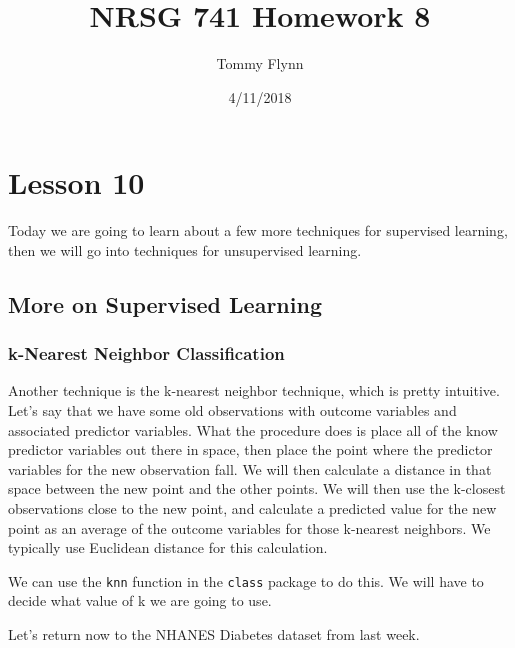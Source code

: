\documentclass[]{article}
\title{NRSG 741 Homework 8}
\author{Tommy Flynn}
\date{4/11/2018}
\newenvironment{Shaded}{\begin{snugshade}}{\end{snugshade}}
\newcommand{\KeywordTok}[1]{\textcolor[rgb]{0.13,0.29,0.53}{\textbf{#1}}}
\newcommand{\StringTok}[1]{\textcolor[rgb]{0.31,0.60,0.02}{#1}}
\newcommand{\CommentTok}[1]{\textcolor[rgb]{0.56,0.35,0.01}{\textit{#1}}}
\newcommand{\OperatorTok}[1]{\textcolor[rgb]{0.81,0.36,0.00}{\textbf{#1}}}
\newcommand{\NormalTok}[1]{#1}
\begin{document}
\maketitle

\section{Lesson 10}\label{lesson-10}

Today we are going to learn about a few more techniques for supervised
learning, then we will go into techniques for unsupervised learning.

\subsection{More on Supervised
Learning}\label{more-on-supervised-learning}

\subsubsection{k-Nearest Neighbor
Classification}\label{k-nearest-neighbor-classification}

Another technique is the k-nearest neighbor technique, which is pretty
intuitive. Let's say that we have some old observations with outcome
variables and associated predictor variables. What the procedure does is
place all of the know predictor variables out there in space, then place
the point where the predictor variables for the new observation fall. We
will then calculate a distance in that space between the new point and
the other points. We will then use the k-closest observations close to
the new point, and calculate a predicted value for the new point as an
average of the outcome variables for those k-nearest neighbors. We
typically use Euclidean distance for this calculation.

We can use the \texttt{knn} function in the \texttt{class} package to do
this. We will have to decide what value of k we are going to use.

Let's return now to the NHANES Diabetes dataset from last week.

\begin{Shaded}
\end{Shaded}
\end{document}
